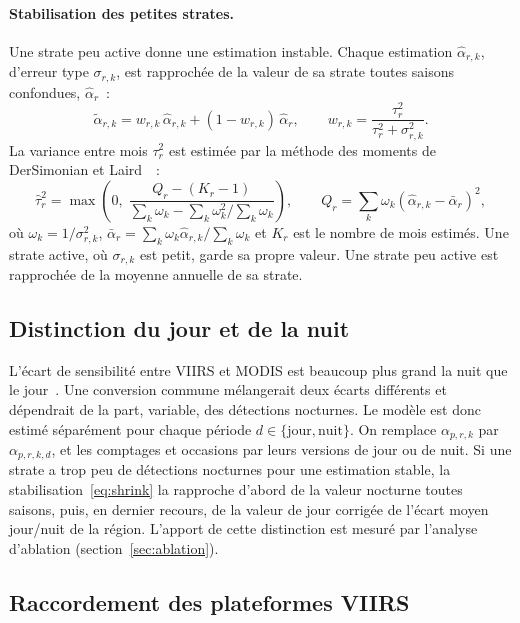 \documentclass[11pt,a4paper]{article}
\begin{document}
\paragraph{Stabilisation des petites strates.} Une strate peu active donne une estimation instable. Chaque estimation $\hat\alpha_{r,k}$, d'erreur type $\sigma_{r,k}$, est rapprochée de la valeur de sa strate toutes saisons confondues, $\hat\alpha_r$~:
\begin{equation}
  \tilde\alpha_{r,k} = w_{r,k}\,\hat\alpha_{r,k} + (1 - w_{r,k})\,\hat\alpha_r, \qquad w_{r,k} = \frac{\tau_r^2}{\tau_r^2 + \sigma_{r,k}^2}.
  \label{eq:shrink}
\end{equation}
La variance entre mois $\tau_r^2$ est estimée par la méthode des moments de DerSimonian et Laird~\cite{dersimonian1986}~:
\begin{equation}
  \hat\tau_r^2 = \max\!\left(0,\; \frac{Q_r - (K_r - 1)}{\sum_k \omega_k - \sum_k \omega_k^2 / \sum_k \omega_k}\right), \qquad Q_r = \sum_k \omega_k \left(\hat\alpha_{r,k} - \bar\alpha_r\right)^2,
\end{equation}
où $\omega_k = 1/\sigma_{r,k}^2$, $\bar\alpha_r = \sum_k \omega_k \hat\alpha_{r,k} / \sum_k \omega_k$ et $K_r$ est le nombre de mois estimés. Une strate active, où $\sigma_{r,k}$ est petit, garde sa propre valeur. Une strate peu active est rapprochée de la moyenne annuelle de sa strate.

\subsection{Distinction du jour et de la nuit}\label{sec:journuit}

L'écart de sensibilité entre VIIRS et MODIS est beaucoup plus grand la nuit que le jour~\cite{schroeder2014}. Une conversion commune mélangerait deux écarts différents et dépendrait de la part, variable, des détections nocturnes. Le modèle est donc estimé séparément pour chaque période $d \in \{\text{jour}, \text{nuit}\}$. On remplace $\alpha_{p,r,k}$ par $\alpha_{p,r,k,d}$, et les comptages et occasions par leurs versions de jour ou de nuit. Si une strate a trop peu de détections nocturnes pour une estimation stable, la stabilisation~\eqref{eq:shrink} la rapproche d'abord de la valeur nocturne toutes saisons, puis, en dernier recours, de la valeur de jour corrigée de l'écart moyen jour/nuit de la région. L'apport de cette distinction est mesuré par l'analyse d'ablation (section~\ref{sec:ablation}).

\subsection{Raccordement des plateformes VIIRS}
\end{document}
